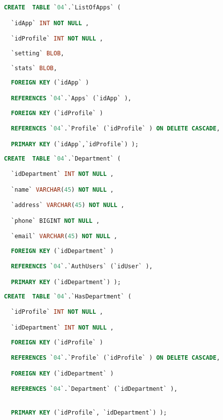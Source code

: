 \begin{lstlisting}[language=SQL,breaklines=true, label=createListOfApps, caption=Create ListOfApps]
CREATE  TABLE `04`.`ListOfApps` (

  `idApp` INT NOT NULL ,

  `idProfile` INT NOT NULL ,
  
  `setting` BLOB,
  
  `stats` BLOB,
  
  FOREIGN KEY (`idApp` )

  REFERENCES `04`.`Apps` (`idApp` ),
  
  FOREIGN KEY (`idProfile` )

  REFERENCES `04`.`Profile` (`idProfile` ) ON DELETE CASCADE,

  PRIMARY KEY (`idApp`,`idProfile`) );

\end{lstlisting}

\begin{lstlisting}[language=SQL,breaklines=true, label=createDepartment, caption=Create Department]
CREATE  TABLE `04`.`Department` (

  `idDepartment` INT NOT NULL ,

  `name` VARCHAR(45) NOT NULL ,

  `address` VARCHAR(45) NOT NULL ,

  `phone` BIGINT NOT NULL ,

  `email` VARCHAR(45) NOT NULL ,
  
  FOREIGN KEY (`idDepartment` )

  REFERENCES `04`.`AuthUsers` (`idUser` ),

  PRIMARY KEY (`idDepartment`) );

\end{lstlisting}

\begin{lstlisting}[language=SQL,breaklines=true, label=createHasDepartment, caption=Create HasDepartment]
CREATE  TABLE `04`.`HasDepartment` (

  `idProfile` INT NOT NULL ,

  `idDepartment` INT NOT NULL ,
  
  FOREIGN KEY (`idProfile` )

  REFERENCES `04`.`Profile` (`idProfile` ) ON DELETE CASCADE,

  FOREIGN KEY (`idDepartment` )

  REFERENCES `04`.`Department` (`idDepartment` ),


  PRIMARY KEY (`idProfile`, `idDepartment`) );

\end{lstlisting}

